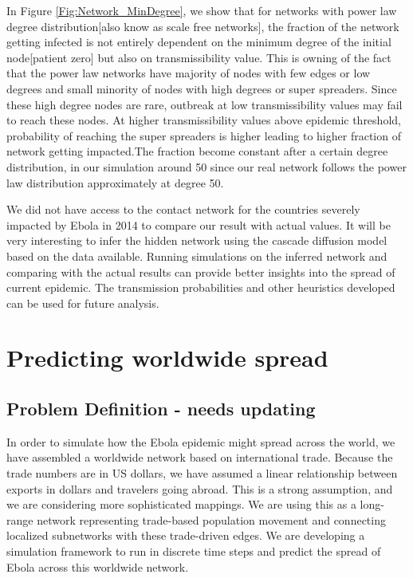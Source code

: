 \documentclass[10pt, journal,onecolumn]{IEEEtran}
\begin{document}
In Figure \ref{Fig:Network_MinDegree}, we show that  for networks with power law degree distribution[also know as scale free networks], the fraction of the network getting infected is not entirely dependent on the minimum degree of the  initial node[patient zero] but also on transmissibility value. This is owning of the fact that the power law networks have majority  of nodes with few edges or low degrees and small minority of nodes with high degrees or super spreaders. Since these high degree nodes are rare, outbreak at low transmissibility values  may fail to reach these nodes. At higher transmissibility values above epidemic threshold, probability of reaching the super spreaders is higher leading to higher fraction of network getting impacted.The fraction become constant after a certain degree distribution, in our simulation around 50 since our real network follows the power law distribution approximately at degree 50. 

We did not have access to the  contact network for the countries  severely impacted by Ebola in 2014 to compare our result with actual values.  It will be  very interesting to infer the hidden network using the cascade diffusion model based on the data available. Running simulations on  the inferred network and comparing  with the actual results can provide better insights into the spread of  current epidemic. The transmission probabilities and other heuristics developed can be used for future analysis.




\section{Predicting worldwide spread}
\label{sec:Worldwide}

\subsection{{Problem Definition} - needs updating}
In order to simulate how the Ebola epidemic might spread across the world, we have assembled a
worldwide network based on international trade. Because the trade numbers are in US dollars,
we have assumed a linear relationship between exports in dollars and travelers going abroad.
This is a strong assumption, and we are considering more sophisticated mappings.
We are using this as a long-range network representing trade-based population movement and
connecting localized subnetworks with these trade-driven edges. We are developing a simulation
framework to run in discrete time steps and predict the spread of Ebola across this worldwide network.
\end{document}
